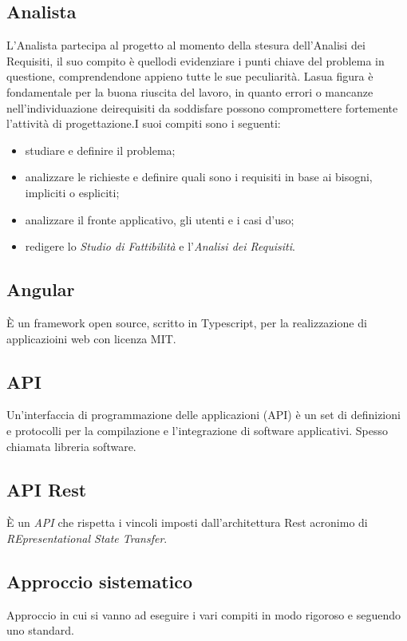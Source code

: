 \subsection*{Analista} L’Analista partecipa al progetto al momento della stesura dell’Analisi dei Requisiti, il suo compito è quellodi evidenziare i punti chiave del problema in questione, comprendendone appieno tutte le sue peculiarità. Lasua figura è fondamentale per la buona riuscita del lavoro, in quanto errori o mancanze nell’individuazione deirequisiti da soddisfare possono compromettere fortemente l’attività di progettazione.I suoi compiti sono i seguenti:
\begin{itemize}
    \item studiare e definire il problema;
    \item analizzare le richieste e definire quali sono i requisiti in base ai bisogni, impliciti o espliciti;
    \item analizzare il fronte applicativo, gli utenti e i casi d’uso;
    \item redigere lo \textit{Studio di Fattibilità} e l’\textit{Analisi dei Requisiti}.
\end{itemize}

\subsection*{Angular} È un framework open source, scritto in Typescript, per la realizzazione di applicazioini web con licenza MIT.

\subsection*{API} Un'interfaccia di programmazione delle applicazioni (API) è un set di definizioni e protocolli per la compilazione e l'integrazione di software applicativi. Spesso chiamata libreria software.

\subsection*{API Rest} È un \textit{API} che rispetta i vincoli imposti dall'architettura Rest acronimo di \textit{REpresentational State Transfer}.

\subsection*{Approccio sistematico} Approccio in cui si vanno ad eseguire i vari compiti in modo rigoroso e seguendo uno standard.

